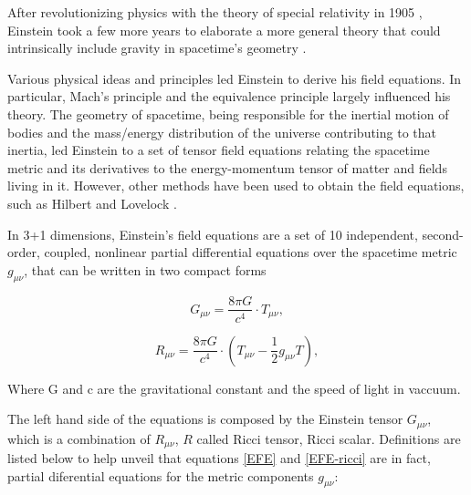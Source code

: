After revolutionizing physics with the theory of special relativity in 1905 \cite{Einstein:1905}, Einstein took a few more years to elaborate a more general theory that could intrinsically include gravity in spacetime's geometry \cite{Einstein:1915ca}.

Various physical ideas and principles led Einstein to derive his field equations. In particular, Mach's principle \cite{mach1919science, 1995mpfn.conf.....B} and the equivalence principle largely influenced his theory. The geometry of spacetime, being responsible for the inertial motion of bodies and the mass/energy distribution of the universe contributing to that inertia, led Einstein to a set of tensor field equations relating the spacetime metric and its derivatives to the energy-momentum tensor of matter and fields living in it. However, other methods have been used to obtain the field equations, such as Hilbert \cite{Hilbert:1915tx} and Lovelock \cite{Lovelock:1971yv}. 

In 3+1 dimensions, Einstein's field equations are a set of 10 independent, second-order, coupled, nonlinear partial differential equations over the spacetime metric $g_{\mu \nu}$, that can be written in two compact forms



\begin{equation}\label{EFE}
G_{\mu\nu}  =  \frac{8\pi G}{c^4} \cdot T_{\mu\nu},
\end{equation}

\begin{equation}\label{EFE-ricci}
R_{\mu\nu}  =  \frac{8\pi G}{c^4} \cdot (T_{\mu\nu} - \frac{1}{2} g_{\mu\nu} T), 
\end{equation}

Where G and c are the gravitational constant and the speed of light in vaccuum. 

The left hand side of the equations is composed by the Einstein tensor $G_{\mu\nu}$, which is a combination of $R_{\mu\nu}$, $R$ called Ricci tensor, Ricci scalar. Definitions are listed below to help unveil that equations \ref{EFE} and \ref{EFE-ricci} are in fact, partial diferential equations for the metric components $g_{\mu\nu}$:


